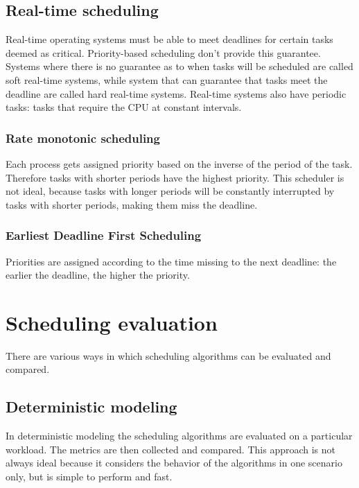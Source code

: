 \subsection{Real-time scheduling}
Real-time operating systems must be able to meet deadlines for certain tasks deemed as critical. Priority-based scheduling don't provide this guarantee. Systems where there is no guarantee as to when tasks will be scheduled are called soft real-time systems, while system that can guarantee that tasks meet the deadline are called hard real-time systems. Real-time systems also have periodic tasks: tasks that require the CPU at constant intervals.


\subsubsection{Rate monotonic scheduling}
Each process gets assigned priority based on the inverse of the period of the task. Therefore tasks with shorter periods have the highest priority. This scheduler is not ideal, because tasks with longer periods will be constantly interrupted by tasks with shorter periods, making them miss the deadline.


\subsubsection{Earliest Deadline First Scheduling}
Priorities are assigned according to the time missing to the next deadline: the earlier the deadline, the higher the priority.


\section{Scheduling evaluation}
There are various ways in which scheduling algorithms can be evaluated and compared.

\subsection{Deterministic modeling}
In deterministic modeling the scheduling algorithms are evaluated on a particular workload. The metrics are then collected and compared. This approach is not always ideal because it considers the behavior of the algorithms in one scenario only, but is simple to perform and fast.

